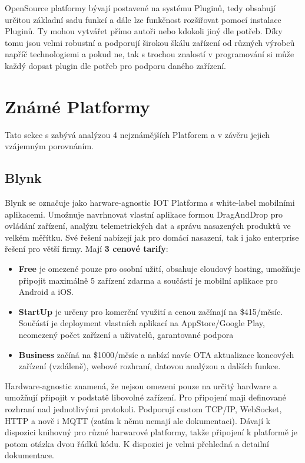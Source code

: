 \documentclass[thesis=B,czech]{FITthesis}[2019/12/23]
\begin{document}
OpenSource platformy bývají postavené na systému Pluginů, tedy obsahují určitou základní sadu funkcí a dále lze funkčnost rozšiřovat pomocí instalace Pluginů. Ty mohou vytvářet přímo autoři nebo kdokoli jiný dle potřeb. Díky tomu jsou velmi robustní a podporují širokou škálu zařízení od různých výrobců napříč technologiemi a pokud ne, tak s trochou znalostí v programování si může každý dopsat plugin dle potřeb pro podporu daného zařízení.


\section{Známé Platformy}  %
Tato sekce s zabývá analýzou 4 nejznámějších Platforem a v závěru jejich vzájemným porovnáním.

\subsection{Blynk}
Blynk se označuje jako harware-agnostic IOT Platforma s white-label mobilními aplikacemi. Umožnuje navrhnovat vlastní aplikace formou DragAndDrop pro ovládání zařízení, analýzu telemetrických dat a správu nasazených produktů ve velkém měřítku. Své řešení nabízejí jak pro domácí nasazení, tak i jako enterprise řešení pro větší firmy. Mají \textbf{3 cenové tarify}:
\begin{itemize}
\item \textbf{Free} je omezené pouze pro osobní užití, obsahuje cloudový hosting, umožňuje připojit maximálně 5 zařízení zdarma a součástí je mobilní aplikace pro Android a iOS.
\item \textbf{StartUp} je určeny pro komerční využití a cenou začínají na \$415/měsíc. Součástí je deployment vlastních aplikací na AppStore/Google Play, neomezený počet zařízení a uživatelů, garantované podpora
\item \textbf{Business} začíná na \$1000/měsíc a nabízí navíc OTA aktualizace koncových zařízení (vzdáleně), webové rozhraní, datovou analýzou a dalších funkce.
\end{itemize}

Hardware-agnostic znamená, že nejsou omezeni pouze na určitý hardware a umožňují připojit v podstatě libovolné zařízení. Pro připojení maji definované rozhraní nad jednotlivými protokoli. Podporují custom TCP/IP, WebSocket, HTTP a nově i MQTT (zatím k němu nemají ale dokumentaci). Dávají k dispozici knihovný pro různé harwarové platformy, takže připojení k platformě je potom otázka dvou řádků kódu. K dispozici je velmi přehledná a detailní dokumentace.
\end{document}

